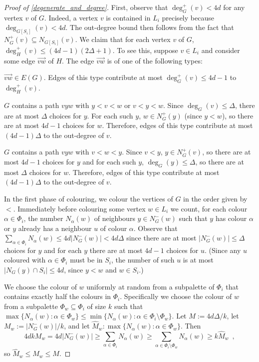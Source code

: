 \documentclass{patmorin}
\begin{document}
\begin{proof}[Proof of \cref{degenerate_and_degree}]
  First, observe that $\deg^+_G(v)< 4d$ for any vertex $v$ of $G$. Indeed, a vertex $v$ is contained in $L_i$ precisely because $\deg_{G[S_i]}(v)<4d$.  The out-degree bound then follows from the fact that $N^+_{G}(v)\subseteq N_{G[S_i]}(v)$.  We claim that for each vertex $v$ of $G$, $\deg^+_{H}(v)\le (4d-1)(2\Delta+1)$.  To see this, suppose $v\in L_i$ and consider some edge $\overrightarrow{vw}$ of $H$.  The edge  $\overrightarrow{vw}$ is of one of the following types:
  \begin{compactenum}[(T1)]
    \item $\overrightarrow{vw}\in E(G)$. Edges of this type contribute at most $\deg^+_{G}(v)\le 4d-1$ to $\deg^+_{H}(v)$.
    \item $G$ contains a path $vyw$ with $y < v < w$ or $v < y < w$.  Since $\deg_G(v)\le\Delta$, there are at most $\Delta$ choices for $y$.  For each such $y$, $w\in N^+_G(y)$ (since $y<w$), so there are at most $4d-1$ choices for $w$.  Therefore, edges of this type contribute at most $(4d-1)\Delta$ to the out-degree of $v$.
    \item $G$ contains a path $vyw$ with $v < w < y$.  Since $v<y$, $y\in N_G^+(v)$, so there are at most $4d-1$ choices for $y$ and for each such $y$, $\deg_G(y)\le\Delta$, so there are at most $\Delta$ choices for $w$.  Therefore, edges of this type contribute at most $(4d-1)\Delta$ to the out-degree of $v$.
  \end{compactenum}
  In the first phase of colouring, we colour the vertices of $G$ in the order given by $<$.  Immediately before colouring some vertex $w\in L_i$ we count, for each colour $\alpha\in \Phi_i$, the number $N_\alpha(w)$ of neighbours $y\in N^-_G(w)$ such that $y$ has colour $\alpha$ or $y$ already has a neighbour $u$ of colour $\alpha$. Observe that $\sum_{\alpha\in \Phi_i} N_\alpha(w)\le 4d|N^-_G(w)|< 4d\Delta$ since there are at most $|N^-_G(w)|\le\Delta$ choices for $y$ and for each $y$ there are at most $4d-1$ choices for $u$.  (Since any $u$ coloured with $\alpha\in\Phi_i$ must be in $S_i$, the number of such $u$ is at most $|N_G(y)\cap S_i|\le 4d$, since $y < w$ and $w\in S_i$.)

  We choose the colour of $w$ uniformly at random from a subpalette of $\Phi_i$ that contains exactly half the colours in $\Phi_i$.  Specifically we choose the colour of $w$ from a subpalette $\Phi_w\subseteq \Phi_i$ of size $k$ such that $\max\{N_\alpha(w):\alpha\in \Phi_w\}\le\min\{N_\alpha(w):\alpha\in\Phi_i\setminus\Phi_w\}$.  Let $M:=4d\Delta/k$, let $M_w:=|N^-_G(w)|/k$, and let $\hat{M}_w:\max\{N_\alpha(w):\alpha\in \Phi_w\}$.  Then
  \[
    4dk M_w = 4d|N^-_G(w)| \ge \sum_{\alpha\in \Phi_i} N_\alpha(w) \ge \sum_{\alpha\in\Phi_i\setminus\Phi_w}N_\alpha(w) \ge k\hat{M}_w \enspace,
  \]
  so $\hat{M}_w\le M_w\le M$.


\end{proof}
\end{document}
